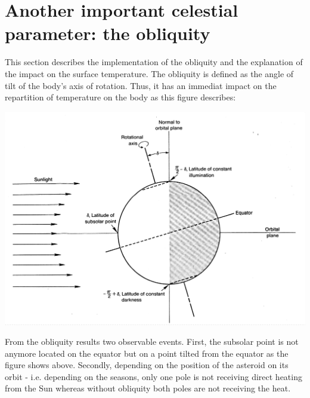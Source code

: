 \section{Another important celestial parameter: the obliquity}
\label{sec:6}

This section describes the implementation of the obliquity and the explanation of the impact on the surface temperature. The obliquity is defined as the angle of tilt of the body's axis of rotation. Thus, it has an immediat impact on the repartition of temperature on the body as this figure describes: 
\begin{center}
    \includegraphics[width=\linewidth]{rsc/obliquity.png}
\end{center}
From the obliquity results two observable events. First, the subsolar point is not anymore located on the equator but on a point tilted from the equator as the figure shows above. Secondly, depending on the position of the asteroid on its orbit - i.e. depending on the seasons, only one pole is not receiving direct heating from the Sun whereas without obliquity both poles are not receiving the heat.

